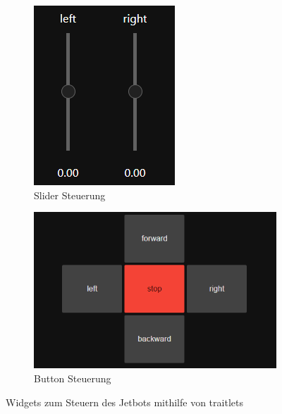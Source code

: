 \begin{figure}[H]
    \centering
    \begin{subfigure}{0.253\textwidth}
        \includegraphics[width=1.0\linewidth]{Bilder/slider.png}
        \caption{Slider Steuerung}
    \end{subfigure}
    \begin{subfigure}{0.5\textwidth}
        \includegraphics[width=1.0\linewidth]{Bilder/buttons.png}
        \caption{Button Steuerung}
    \end{subfigure}
    \label{fig:Bild4.1}
    \caption[Widget-Steuerung]{Widgets zum Steuern des Jetbots mithilfe von traitlets}
\end{figure}

